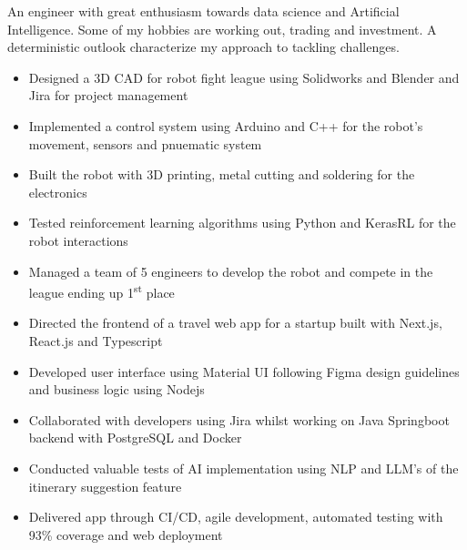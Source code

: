 \documentclass[11pt,a4paper,ragged2e]{altacv}
\begin{document}
\begin{paracol}{1}
\smallskip
{}

An engineer with great enthusiasm towards data science and Artificial Intelligence. Some of my hobbies are working out, trading and investment. A deterministic outlook characterize my approach to tackling challenges.\smallskip



\begin{itemize}
\item Designed a 3D CAD for robot fight league using Solidworks and Blender and Jira for project management
\item Implemented a control system using Arduino and C++ for the robot's movement, sensors and pnuematic system
\item Built the robot with 3D printing, metal cutting and soldering for the electronics
\item Tested reinforcement learning algorithms using Python and KerasRL for the robot interactions
\item Managed a team of 5 engineers to develop the robot and compete in the league ending up 1\textsuperscript{st} place
\end{itemize}
\tightdivider

\begin{itemize}
\item Directed the frontend of a travel web app for a startup built with Next.js, React.js and Typescript
\item Developed user interface using Material UI following Figma design guidelines and business logic using Nodejs
\item Collaborated with developers using Jira whilst working on Java Springboot backend with PostgreSQL and Docker
\item Conducted valuable tests of AI implementation using NLP and LLM's of the itinerary suggestion feature
\item Delivered app through CI/CD, agile development, automated testing with 93\% coverage and web deployment 
\end{itemize}
\tightdivider


\end{paracol}
\end{document}
